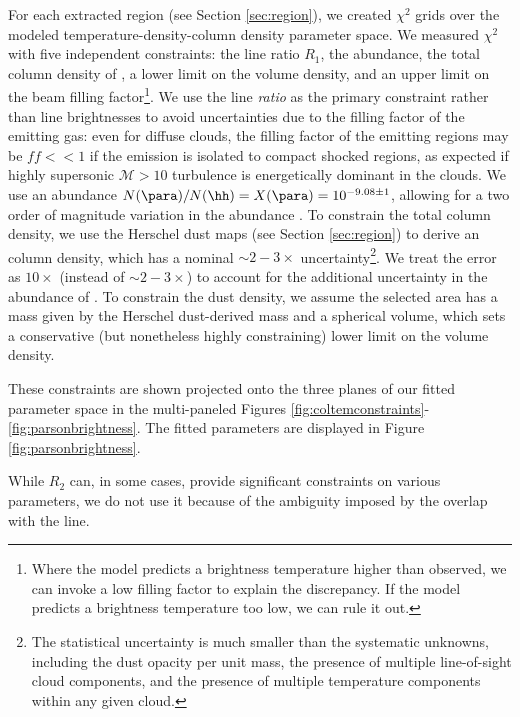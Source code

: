 For each extracted region (see Section \ref{sec:region}), we created $\chi^2$
grids over the modeled temperature-density-column density parameter space.  We
measured $\chi^2$ with five independent constraints: the line ratio $R_1$, the
\formaldehyde abundance, the total column density of \hh, a lower limit on the
\hh volume density, and an upper limit on the beam filling
factor\footnote{Where the model predicts a brightness temperature higher than
observed, we can invoke a low filling factor to explain the discrepancy.  If
the model predicts a brightness temperature too low,
we can rule it out.}.  We use the
line \emph{ratio} as the primary constraint rather than line brightnesses to
avoid uncertainties due to the filling factor of the emitting gas: even for
diffuse clouds, the filling factor of the emitting regions may be $ff<<1$ if
the emission is isolated to compact shocked regions, as expected if highly
supersonic $\mathcal{M}>10$ turbulence is energetically dominant in the clouds.
We use an abundance $N(\para)/N(\hh) = X(\para) =
10^{-9.08\pm1}$, allowing for a two order of magnitude variation in
the \formaldehyde abundance
\citep{Ginsburg2013a,Carey1998a,Wootten1978a,Mundy1987a}.  To constrain the
total column density, we use the Herschel dust maps (see Section
\ref{sec:region}) to derive an \hh column
density, which has a nominal $\sim2-3\times$ uncertainty\footnote{The
statistical uncertainty is much smaller than the systematic unknowns, including
the dust opacity per unit mass, the presence of multiple line-of-sight cloud
components, and the presence of multiple temperature components within any
given cloud.}.  We treat the error as $10\times$ (instead of $\sim2-3\times$)
to account for the additional uncertainty in the abundance of \para.  To
constrain the dust density, we assume the selected area has a mass given by the
Herschel dust-derived mass and a spherical volume, which sets a conservative
(but nonetheless highly constraining) lower limit on the volume density.

These constraints are shown projected onto the three planes of our fitted
parameter space in the multi-paneled Figures
\ref{fig:coltemconstraints}-\ref{fig:parsonbrightness}.  The fitted parameters
are displayed in Figure \ref{fig:parsonbrightness}.

While $R_2$ can, in some cases, provide significant constraints on various
parameters, we do not use it because of the ambiguity imposed by the overlap
with the \methanol \fourtwotwo line.



